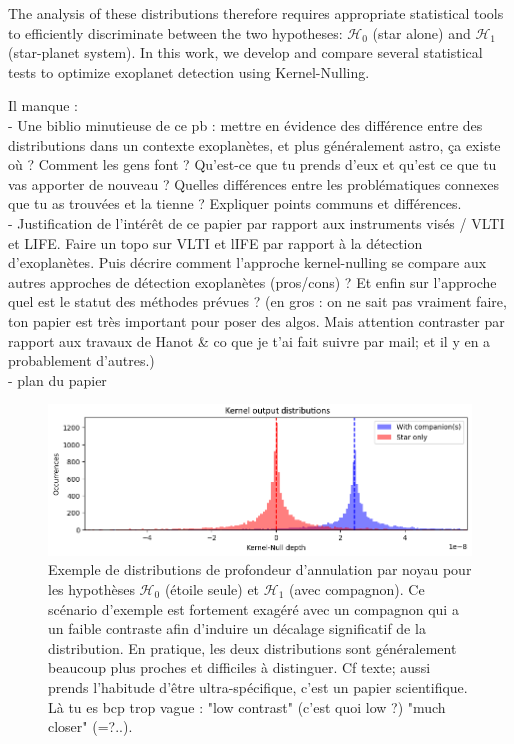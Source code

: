 \documentclass{article}
\newcommand{\dm}[1]{{\color{mulberry} #1}}
\begin{document}
The analysis of these distributions therefore requires appropriate statistical tools to efficiently discriminate between the two hypotheses: $\mathcal{H}_0$ (star alone) and $\mathcal{H}_1$ (star-planet system). In this work, we develop and compare several statistical tests to optimize exoplanet detection using Kernel-Nulling.

\dm{Il manque :\\
- Une biblio minutieuse de ce pb : mettre en évidence des différence entre des distributions dans un contexte exoplanètes, et plus généralement astro, ça existe où ? Comment les gens font ? Qu'est-ce que tu prends d'eux et qu'est ce que tu vas apporter de nouveau ? Quelles différences entre les problématiques connexes que tu as trouvées et la tienne ? Expliquer points communs et différences.\\
- Justification de l'intérêt de ce papier par rapport aux instruments visés / VLTI et LIFE. Faire un topo sur VLTI et lIFE par rapport à la détection d'exoplanètes. Puis décrire comment l'approche kernel-nulling se compare aux autres approches de détection exoplanètes (pros/cons) ? Et enfin sur l'approche quel est le statut des méthodes prévues ? (en gros : on ne sait pas vraiment faire, ton papier est très important pour poser des algos. Mais attention contraster par rapport aux travaux de Hanot \& co que je t'ai fait suivre par mail; et il y en a probablement d'autres.)\\ 
- plan du papier}

\begin{figure}[H]
\centering
\includegraphics[width=\linewidth]{img/output_distribution.png}
\caption{Exemple de distributions de profondeur d'annulation par noyau pour les hypothèses $\mathcal{H}_0$ (étoile seule) et $\mathcal{H}_1$ (avec compagnon). Ce scénario d'exemple est fortement exagéré avec un compagnon qui a un faible contraste afin d'induire un décalage significatif de la distribution. En pratique, les deux distributions sont généralement beaucoup plus proches et difficiles à distinguer.\dm{Cf texte; aussi prends l'habitude d'être ultra-spécifique, c'est un papier scientifique. Là tu es bcp trop vague : "low contrast" (c'est quoi low ?) "much closer" (=?..)}.}
\label{fig:distribution}
\end{figure}
\end{document}
